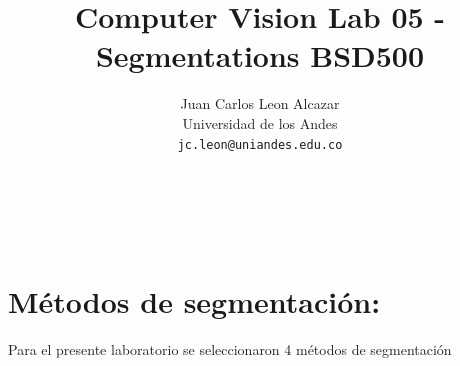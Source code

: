 \documentclass[10pt,twocolumn,letterpaper]{article}
\begin{document}
\title{Computer Vision Lab 05 -Segmentations BSD500}

\author{Juan Carlos Leon Alcazar\\
Universidad de los Andes\\
{\tt\small jc.leon@uniandes.edu.co}
\and
\\
\\
\\
{\tt\small }
}

\maketitle

\begin{abstract}
   
\end{abstract}

\section{Métodos de segmentación:}
Para  el presente laboratorio se seleccionaron 4 métodos de segmentación
\end{document}
